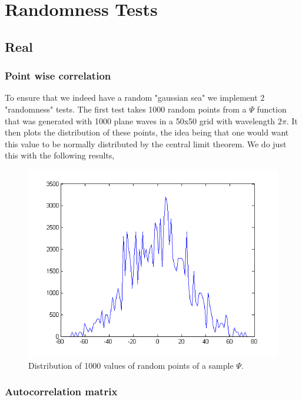 \documentclass[12pt]{article}
\begin{document}
\section{Randomness Tests}

\subsection{Real}

\subsubsection{Point wise correlation}

To ensure that we indeed have a random "gaussian sea" we implement 2 "randomness" tests. The first test takes 1000 random points from a $\Psi$ function that was generated with 1000 plane waves in a 50x50 grid with wavelength $2 \pi$. It then plots the distribution of these points, the idea being that one would want this value to be normally distributed by the central limit theorem. We do just this with the following results,

\begin{figure}[hpt]
	\centering
		\includegraphics[width=1.00\textwidth]{randomdist1000p50by50wav1000.png}
	\caption{Distribution of 1000 values of random points of a sample $\Psi$.}
	\label{fig:randomdist1000p50by50wav1000}
\end{figure}

\pagebreak

\subsubsection{Autocorrelation matrix}
\end{document}
